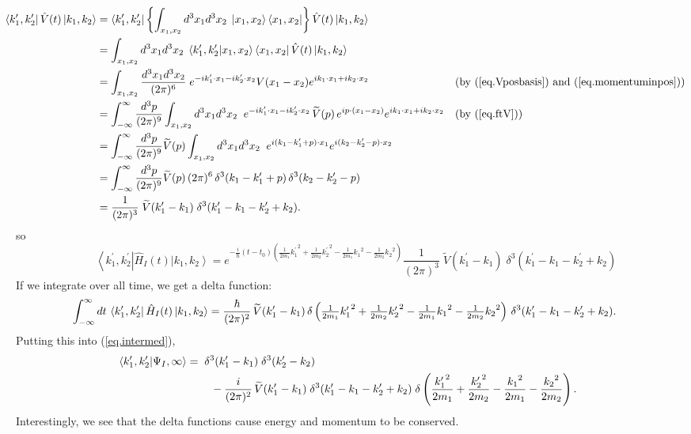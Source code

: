 \documentclass[11pt]{article}
\newcommand{\bra}[1]{\left\langle#1\right|}
\newcommand{\ket}[1]{\left|#1\right\rangle}
\newcommand{\braket}[2]{\left\langle#1|#2\right\rangle}
\newcommand{\op}[1]{\hat{#1}}
\theoremstyle{theorem}
\theoremstyle{remark}
\theoremstyle{step}
\theoremstyle{gap}
\begin{document}
\begin{align*}
\hspace{-1em}\bra{k_1^\prime, k_2^\prime} \op{V}(t) \ket{k_1, k_2} &= \bra{k_1^\prime, k_2^\prime} \left\{\int_{x_1, x_2} {d^3 x_1 d^3 x_2\;} \ket{x_1, x_2}\bra{x_1, x_2}\right\}\op{V}(t) \ket{k_1, k_2} \nonumber\\
&= \int_{x_1, x_2} {d^3 x_1 d^3 x_2\;} \braket{k_1^\prime, k_2^\prime}{x_1, x_2}\bra{x_1, x_2}\op{V}(t) \ket{k_1, k_2} \nonumber\\
&= \int_{x_1, x_2} \frac{d^3 x_1 d^3 x_2}{(2\pi)^6}\; e^{-ik_1^\prime\cdot x_1 - ik_2^\prime\cdot x_2}V(x_1 - x_2) e^{ik_1\cdot x_1 + ik_2\cdot x_2} &&\text{(by (\ref{eq.Vposbasis}) and (\ref{eq.momentuminpos}))}\nonumber\\
&= \int_{-\infty}^{\infty} \frac{d^3p}{(2\pi)^9}\int_{x_1, x_2} {d^3 x_1 d^3 x_2\;\;}e^{-ik_1^\prime\cdot x_1 - ik_2^\prime\cdot x_2}\,\widetilde{V}(p)\,e^{ip\cdot(x_1-x_2)} e^{ik_1\cdot x_1 + ik_2\cdot x_2}
&&\text{(by (\ref{eq.ftV}))}\nonumber\\
&= \int_{-\infty}^{\infty} \frac{d^3p}{(2\pi)^9}\widetilde{V}(p) \int_{x_1, x_2} {d^3 x_1 d^3 x_2\;\;}e^{i(k_1-k_1^\prime+p)\cdot x_1}e^{i(k_2-k_2^\prime-p)\cdot x_2}\nonumber\\
&= \int_{-\infty}^{\infty} \frac{d^3p}{(2\pi)^9}\widetilde{V}(p) \,(2\pi)^6\,\delta^3(k_1-k_1^\prime+p)\,\delta^3(k_2-k_2^\prime-p)\nonumber\\
&= \frac{1}{(2\pi)^3}\;\widetilde{V}(k_1^\prime-k_1) \;\delta^3(k_1^\prime-k_1-k_2^\prime+k_2).
\end{align*}
so 
\[
\bra{k_1^\prime, k_2^\prime} \op{H}_I(t)\ket{k_1, k_2}
=
e^{-\frac{i}{\hbar}\left(t-t_0\right)\left(\frac{1}{2m_1}{k_1^\prime}^2 + \frac{1}{2m_2}{k_2^\prime}^2 - \frac{1}{2m_1}{k_1}^2 - \frac{1}{2m_2}{k_2}^2\right)}\frac{1}{(2\pi)^3}\;\widetilde{V}(k_1^\prime-k_1) \;\delta^3(k_1^\prime-k_1-k_2^\prime+k_2)
\]
If we integrate over all time, we get a delta function:
\begin{equation}\label{eq.HIintegrated}
\hspace{-2em}
\int_{-\infty}^\infty dt \,\bra{k_1^\prime, k_2^\prime} \op{H}_I(t)\ket{k_1, k_2}
=
\frac{\hbar}{(2\pi)^2}\,\widetilde{V}(k_1^\prime-k_1)\,\delta\left({\textstyle\frac{1}{2m_1}{k_1^\prime}^2 + \frac{1}{2m_2}{k_2^\prime}^2 - \frac{1}{2m_1}{k_1}^2 - \frac{1}{2m_2}{k_2}^2}\right) \,\delta^3(k_1^\prime-k_1-k_2^\prime+k_2).
\end{equation}
Putting this into (\ref{eq.intermed}),
\begin{align}
\hspace{-1.5em}\braket{k_1^\prime, k_2^\prime}{\Psi_I, \infty}
=& \;\;\delta^3(k_1^\prime - k_1)\;\delta^3(k_2^\prime - k_2) \nonumber\\&\;\;\;\;- \frac{i}{(2\pi)^2}\, \widetilde{V}(k_1^\prime-k_1) \;\delta^3(k_1^\prime-k_1-k_2^\prime+k_2) \;\delta\left(\frac{{k_1^\prime}^2}{2m_1} + \frac{{k_2^\prime}^2}{2m_2} - \frac{{k_1}^2}{2m_1} - \frac{{k_2}^2}{2m_2}\right).
\end{align}
Interestingly, we see that the delta functions cause energy and momentum to be conserved.
\end{document}
